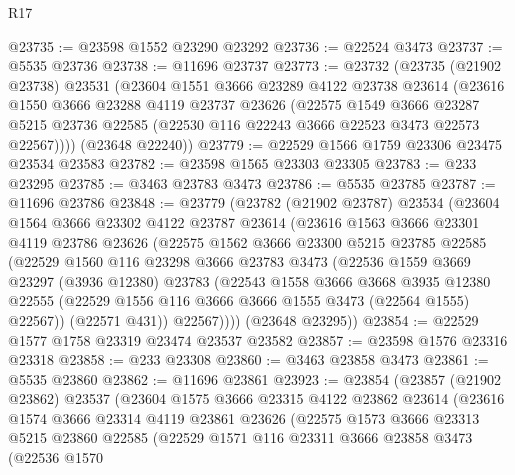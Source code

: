 \begin{lexlean}{R17}
\begin{coremodule}
@23735 := @23598 @1552 @23290 @23292
@23736 := @22524 @3473
@23737 := @5535 @23736
@23738 := @11696 @23737
@23773 := @23732
    (@23735
      (@21902 @23738)
      @23531
      (@23604
        @1551
        @3666
        @23289
        @4122
        @23738
        @23614
        (@23616
          @1550
          @3666
          @23288
          @4119
          @23737
          @23626
          (@22575
            @1549
            @3666
            @23287
            @5215
            @23736
            @22585
            (@22530 @116 @22243 @3666 @22523 @3473 @22573 @22567))))
      (@23648 @22240))
@23779 := @22529 @1566 @1759 @23306 @23475 @23534 @23583
@23782 := @23598 @1565 @23303 @23305
@23783 := @233 @23295
@23785 := @3463 @23783 @3473
@23786 := @5535 @23785
@23787 := @11696 @23786
@23848 := @23779
    (@23782
      (@21902 @23787)
      @23534
      (@23604
        @1564
        @3666
        @23302
        @4122
        @23787
        @23614
        (@23616
          @1563
          @3666
          @23301
          @4119
          @23786
          @23626
          (@22575
            @1562
            @3666
            @23300
            @5215
            @23785
            @22585
            (@22529
              @1560
              @116
              @23298
              @3666
              @23783
              @3473
              (@22536
                @1559
                @3669
                @23297
                (@3936 @12380)
                @23783
                (@22543
                  @1558
                  @3666
                  @3668
                  @3935
                  @12380
                  @22555
                  (@22529 @1556 @116 @3666 @3666 @1555 @3473 (@22564 @1555) @22567))
                (@22571 @431))
              @22567))))
      (@23648 @23295))
@23854 := @22529 @1577 @1758 @23319 @23474 @23537 @23582
@23857 := @23598 @1576 @23316 @23318
@23858 := @233 @23308
@23860 := @3463 @23858 @3473
@23861 := @5535 @23860
@23862 := @11696 @23861
@23923 := @23854
    (@23857
      (@21902 @23862)
      @23537
      (@23604
        @1575
        @3666
        @23315
        @4122
        @23862
        @23614
        (@23616
          @1574
          @3666
          @23314
          @4119
          @23861
          @23626
          (@22575
            @1573
            @3666
            @23313
            @5215
            @23860
            @22585
            (@22529
              @1571
              @116
              @23311
              @3666
              @23858
              @3473
              (@22536
                @1570

\end{coremodule}
\end{lexlean}
